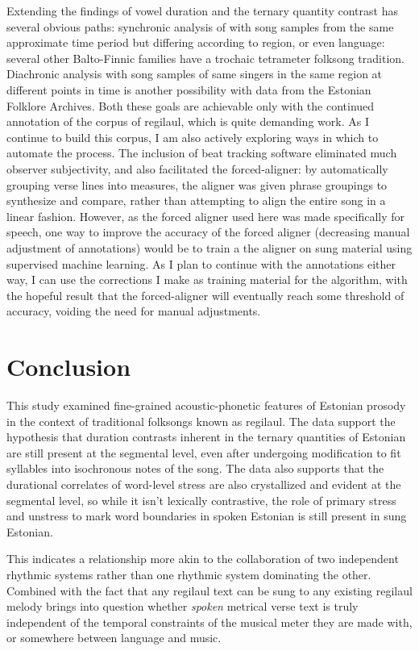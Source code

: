 Extending the findings of vowel duration and the ternary quantity contrast has several obvious paths: synchronic analysis of with song samples from the same approximate time period but differing according to region, or even language: several other Balto-Finnic families have a trochaic tetrameter folksong tradition. Diachronic analysis with song samples of same singers in the same region at different points in time is another possibility with data from the Estonian Folklore Archives. Both these goals are achievable only with the continued annotation of the corpus of regilaul, which is quite demanding work. As I continue to build this corpus, I am also actively exploring ways in which to automate the process. The inclusion of beat tracking software eliminated much observer subjectivity, and also facilitated the forced-aligner: by automatically grouping verse lines into measures, the aligner was given phrase groupings to synthesize and compare, rather than attempting to align the entire song in a linear fashion. However, as the forced aligner used here was made specifically for speech, one way to improve the accuracy of the forced aligner (decreasing manual adjustment of annotations) would be to train a the aligner on sung material using supervised machine learning. As I plan to continue with the annotations either way, I can use the corrections I make as training material for the algorithm, with the hopeful result that the forced-aligner will eventually reach some threshold of accuracy, voiding the need for manual adjustments. 


\section{Conclusion}

This study examined fine-grained acoustic-phonetic features of Estonian prosody in the context of traditional folksongs known as regilaul. The data support the hypothesis that duration contrasts inherent in the ternary quantities of Estonian are still present at the segmental level, even after undergoing modification to fit syllables into isochronous notes of the song. The data also supports that the durational correlates of word-level stress are also crystallized and evident at the segmental level, so while it isn't lexically contrastive, the role of primary stress and unstress to mark word boundaries in spoken Estonian is still present in sung Estonian. 

This indicates a relationship more akin to the collaboration of two independent rhythmic systems rather than one rhythmic system dominating the other. Combined with the fact that any regilaul text can be sung to any existing regilaul melody brings into question whether {\it spoken} metrical verse text is truly independent of the temporal constraints of the musical meter they are made with, or somewhere between language and music. 

